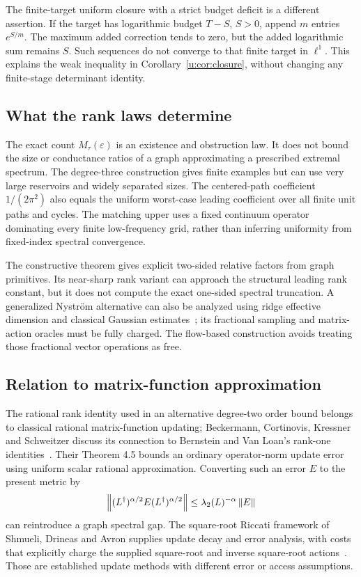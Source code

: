 The finite-target uniform closure with a strict budget deficit is a
different assertion. If the target has logarithmic budget $T-S$,
$S>0$, append $m$ entries $e^{S/m}$. The maximum added correction tends
to zero, but the added logarithmic sum remains $S$. Such sequences do
not converge to that finite target in $\ell^1$. This explains the weak
inequality in Corollary~\ref{u:cor:closure}, without changing any
finite-stage determinant identity.

\subsection{What the rank laws determine}
The exact count $M_\tau(\varepsilon)$ is an existence and obstruction
law. It does not bound the size or conductance ratios of a graph
approximating a prescribed extremal spectrum. The degree-three
construction gives finite examples but can use very large reservoirs
and widely separated sizes. The centered-path coefficient $1/(2\pi^2)$ also equals the uniform
worst-case leading coefficient over all finite unit paths and cycles.
The matching upper uses a fixed continuum operator dominating every
finite low-frequency grid, rather than inferring uniformity from
fixed-index spectral convergence.

The constructive theorem gives explicit two-sided relative factors
from graph primitives. Its near-sharp rank variant can approach the
structural leading rank constant, but it does not compute the exact
one-sided spectral truncation. A generalized Nystr\"om alternative
can also be analyzed using ridge effective dimension and classical
Gaussian estimates~\cite{FTU}; its fractional sampling and matrix-action
oracles must be fully charged. The flow-based construction avoids
treating those fractional vector operations as free.

\subsection{Relation to matrix-function approximation}
The rational rank identity used in an alternative degree-two order bound
belongs to classical rational matrix-function updating; Beckermann, Cortinovis,
Kressner and Schweitzer discuss its connection to Bernstein and
Van Loan's rank-one identities~\cite[Section 3.3]{BCKS}.
Their Theorem 4.5 bounds an ordinary operator-norm update error using
uniform scalar rational approximation. Converting such an error $E$
to the present metric by
\[
 \left\lVert(L^\dagger)^{\alpha/2}E(L^\dagger)^{\alpha/2}\right\rVert
 \le\lambda_2(L)^{-\alpha}\left\lVert E\right\rVert
\]
can reintroduce a graph spectral gap. The square-root Riccati framework
of Shmueli, Drineas and Avron supplies update decay and error analysis,
with costs that explicitly charge the supplied square-root and inverse
square-root actions~\cite[Section 5.5]{SDA}. Those are established
update methods with different error or access assumptions.

